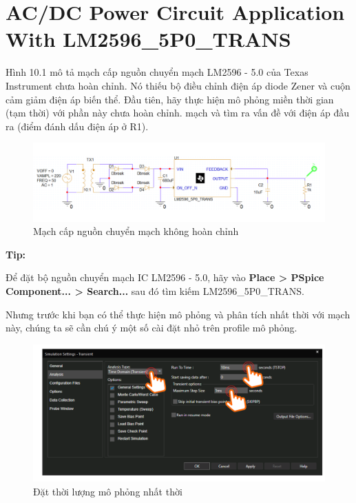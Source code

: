 \section{\large AC/DC Power Circuit Application With LM2596\_5P0\_TRANS}
Hình 10.1 mô tả mạch cấp nguồn chuyển mạch LM2596 - 5.0 của Texas Instrument chưa hoàn chỉnh. Nó thiếu bộ điều chỉnh điện áp diode Zener và cuộn cảm giảm điện áp
biến thể. Đầu tiên, hãy thực hiện mô phỏng miền thời gian (tạm thời) với phần này chưa hoàn chỉnh.
mạch và tìm ra vấn đề với điện áp đầu ra (điểm đánh dấu điện áp ở R1).

\begin{figure}[h]
    \centering
    \includegraphics[scale=0.22]{graphics/ex10/f1.png}
    \caption{Mạch cấp nguồn chuyển mạch không hoàn chỉnh}
\end{figure}

\textbf{Tip:}

Để đặt bộ nguồn chuyển mạch IC LM2596 - 5.0, hãy vào \textbf{Place > PSpice Component...
> Search...} sau đó tìm kiếm LM2596\_5P0\_TRANS.

Nhưng trước khi bạn có thể thực hiện mô phỏng và phân tích nhất thời với mạch này, chúng ta sẽ
cần chú ý một số cài đặt nhỏ trên profile mô phỏng.

\begin{figure}[h]
    \centering
    \includegraphics[scale=0.3]{graphics/ex10/f2.png}
    \caption{Đặt thời lượng mô phỏng nhất thời}
\end{figure}

